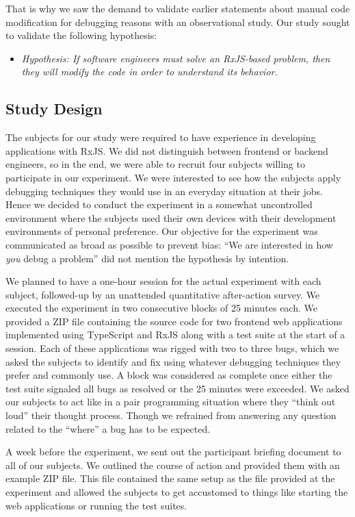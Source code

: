 \documentclass[12pt,a4paper]{article}
\begin{document}
That is why we saw the demand to validate earlier statements about manual code modification for debugging reasons with an observational study. Our study sought to validate the following hypothesis:

\begin{itemize}
	\item \emph{Hypothesis: If software engineers must solve an RxJS-based problem, then they will modify the code in order to understand its behavior.}
\end{itemize}

\subsection{Study Design}

The subjects for our study were required to have experience in developing applications with RxJS. We did not distinguish between frontend or backend engineers, so in the end, we were able to recruit four subjects willing to participate in our experiment. We were interested to see how the subjects apply debugging techniques they would use in an everyday situation at their jobs. Hence we decided to conduct the experiment in a somewhat uncontrolled environment where the subjects used their own devices with their development environments of personal preference. Our objective for the experiment was communicated as broad as possible to prevent bias: ``We are interested in how \emph{you} debug a problem'' did not mention the hypothesis by intention.

We planned to have a one-hour session for the actual experiment with each subject, followed-up by an unattended quantitative after-action survey. We executed the experiment in two consecutive blocks of 25 minutes each. We provided a ZIP file containing the source code for two frontend web applications implemented using TypeScript and RxJS along with a test suite at the start of a session. Each of these applications was rigged with two to three bugs, which we asked the subjects to identify and fix using whatever debugging techniques they prefer and commonly use. A block was considered as complete once either the test suite signaled all bugs as resolved or the 25 minutes were exceeded. We asked our subjects to act like in a pair programming situation where they ``think out loud'' their thought process. Though we refrained from answering any question related to the ``where'' a bug has to be expected.

A week before the experiment, we sent out the participant briefing document to all of our subjects. We outlined the course of action and provided them with an example ZIP file. This file contained the same setup as the file provided at the experiment and allowed the subjects to get accustomed to things like starting the web applications or running the test suites.
\end{document}
